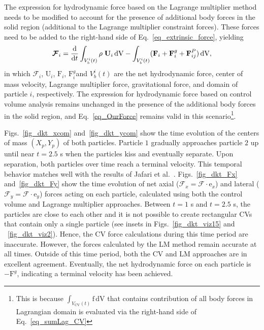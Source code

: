 \documentclass[review]{elsarticle}
\renewcommand \d [2]{\frac{{\rm d} #1}{{\rm d} #2}}
\renewcommand{\vec}[1]{\bm{\mathrm{#1}}}
\def \e{\vec{e}}
\def \F{\vec{F}}
\def \U{\vec{U}}
\def  \Vcvt{V_\text{CV}(t)}
\def \cF{\vec{\mathcal{F}}}
\def \F{\vec{F}}
\def \U{\vec{U}}
\def \e{\vec{e}}
\def \f{\vec{f}}
\def \dV{\,\mathrm{dV}}
\begin{document}
{The expression for hydrodynamic force based on the Lagrange multiplier method needs to be modified to
account for the presence of additional body forces in the solid region (additional to the Lagrange multiplier 
constraint forces). These forces need to be added to the right-hand side of Eq.~\eqref{eq_extrinsic_force}, yielding
\begin{equation}
 \cF_i = \d{}{t} \int_{V_b^i(t)} \rho \; \U_i \dV - \int_{V_b^i(t)} (\F_i + \F_{i}^g + \F_{ij}^P) \dV, \label{eq_extrinsic_force_DKT}
\end{equation}
in which $\cF_i$, $\U_i$, $\F_i$, $\F_{i}^g$and $V_b^i(t)$ are the net hydrodynamic force, center of mass velocity, 
Lagrange multiplier force, gravitational force, and domain of particle $i$, respectively.
The expression for hydrodynamic force based on control volume analysis remains unchanged 
in the presence of the additional body forces in the solid region, and Eq.~\eqref{eq_OurForce} remains 
valid in this scenario\footnote{This is because $\int_{\Vcvt} \f \dV$ that contains contribution of all body forces 
in Lagrangian domain is evaluated via the right-hand side of Eq.~\eqref{eq_sumLag_CV}}.  

Figs.~\ref{fig_dkt_xcom} and~\ref{fig_dkt_ycom} show the time evolution of the centers of mass $(X_p, Y_p)$ of
both particles. Particle $1$ gradually approaches particle $2$ up until near $t = 2.5$ s when the particles kiss and
eventually separate. Upon separation, both particles over time reach a terminal velocity. This temporal behavior matches 
well with the results of Jafari et al.~\cite{Jafari11}. Figs.~\ref{fig_dkt_Fx} and~\ref{fig_dkt_Fy} show the time evolution
of net axial ($\mathcal{F}_x = \cF \cdot \e_x$) and lateral ($\mathcal{F}_y = \cF \cdot \e_y$) forces acting on each particle,
calculated using both the control volume and Lagrange multiplier approaches. Between $t = 1$ s and $t = 2.5$ s, the
particles are close to each other and it is not possible to create rectangular CVs that contain only a single 
particle (see insets in Figs.~\ref{fig_dkt_viz15} and ~\ref{fig_dkt_viz2}). Hence, the CV force 
calculations during this time period are inaccurate. However, the forces calculated by the LM method 
remain accurate at all times. Outside of this time period, both the CV and LM approaches are in 
excellent agreement. Eventually, the net hydrodynamic force on each particle is $-\F^g$, indicating a 
terminal velocity has been achieved.

}
\end{document}
